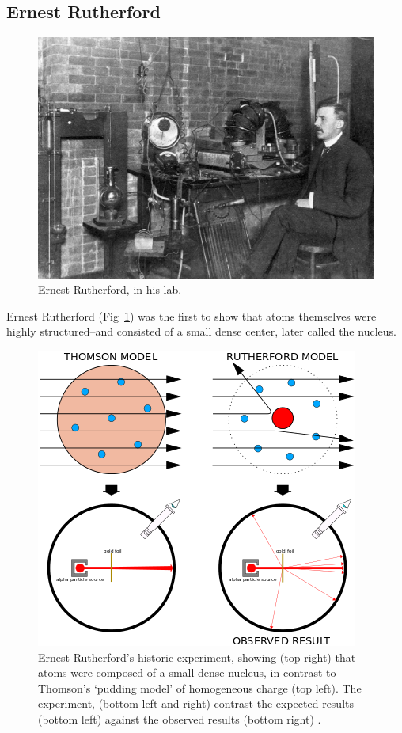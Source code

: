 \subsection{Ernest Rutherford}

\begin{figure}[ht]
	\centering
	\includegraphics[width=0.6\linewidth]{./figures/ernestrutherford.jpg}
	\caption{Ernest Rutherford, in his lab.  \cite{Eve1939}}
	\label{fig:rutherford}
\end{figure}

Ernest Rutherford (Fig~\ref{fig:rutherford}) was the first to show that atoms
themselves were highly structured--and consisted of a small dense center, later
called the nucleus.

\begin{figure}[ht]
	\centering
	\includegraphics[width=0.6\linewidth]{./figures/geiger_marsden.png}
	\caption{
		Ernest Rutherford's historic experiment, showing (top right) that atoms were
		composed of a small dense nucleus, in contrast to Thomson's `pudding model'
		of homogeneous charge (top left). The experiment, (bottom left and right)
		contrast the expected results (bottom left) against the observed results
		(bottom right)  \cite{Kurzon2014}.
	}
	\label{fig:geigermarsden}
\end{figure}

